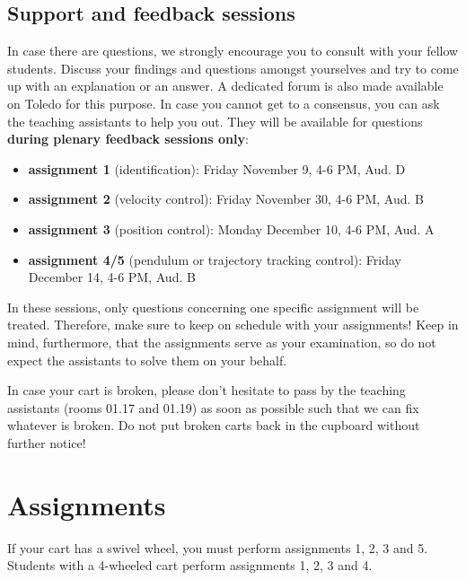 \documentclass[10pt,a4paper]{article}
\begin{document}
\subsection{Support and feedback sessions}
In case there are questions, we strongly encourage you to consult with your fellow students. Discuss your findings and questions amongst yourselves and try to come up with an explanation or an answer. A dedicated forum is also made available on Toledo for this purpose. In case you cannot get to a consensus, you can ask the teaching assistants to help you out. They will be available for questions \textbf{during plenary feedback sessions only}:
\begin{itemize}
\item \textbf{assignment 1} (identification): Friday November 9, 4-6 PM, Aud. D
\item \textbf{assignment 2} (velocity control): Friday November 30, 4-6 PM, Aud. B
\item \textbf{assignment 3} (position control): Monday December 10, 4-6 PM, Aud. A
\item \textbf{assignment 4/5} (pendulum or trajectory tracking control): Friday December 14, 4-6 PM, Aud. B
\end{itemize}

In these sessions, only questions concerning one specific assignment will be treated. Therefore, make sure to keep on schedule with your assignments! Keep in mind, furthermore, that the assignments serve as your examination, so do not expect the assistants to solve them on your behalf.

In case your cart is broken, please don't hesitate to pass by the teaching assistants (rooms 01.17 and 01.19) as soon as possible such that we can fix whatever is broken. Do not put broken carts back in the cupboard without further notice!

\newpage
\section{Assignments}

If your cart has a swivel wheel, you must perform assignments 1, 2, 3 and 5. Students with a 4-wheeled cart perform assignments 1, 2, 3 and 4.
\end{document}
